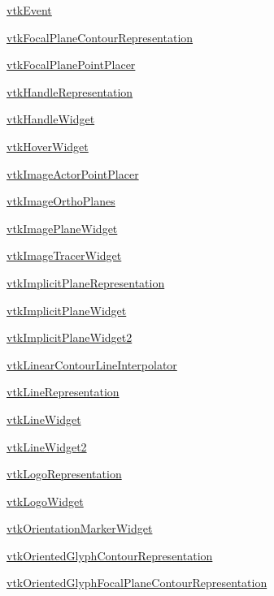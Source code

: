 \begin{DoxyItemize}
\item \hyperlink{vtkwidgets_vtkevent}{vtk\-Event}  
\item \hyperlink{vtkwidgets_vtkfocalplanecontourrepresentation}{vtk\-Focal\-Plane\-Contour\-Representation}  
\item \hyperlink{vtkwidgets_vtkfocalplanepointplacer}{vtk\-Focal\-Plane\-Point\-Placer}  
\item \hyperlink{vtkwidgets_vtkhandlerepresentation}{vtk\-Handle\-Representation}  
\item \hyperlink{vtkwidgets_vtkhandlewidget}{vtk\-Handle\-Widget}  
\item \hyperlink{vtkwidgets_vtkhoverwidget}{vtk\-Hover\-Widget}  
\item \hyperlink{vtkwidgets_vtkimageactorpointplacer}{vtk\-Image\-Actor\-Point\-Placer}  
\item \hyperlink{vtkwidgets_vtkimageorthoplanes}{vtk\-Image\-Ortho\-Planes}  
\item \hyperlink{vtkwidgets_vtkimageplanewidget}{vtk\-Image\-Plane\-Widget}  
\item \hyperlink{vtkwidgets_vtkimagetracerwidget}{vtk\-Image\-Tracer\-Widget}  
\item \hyperlink{vtkwidgets_vtkimplicitplanerepresentation}{vtk\-Implicit\-Plane\-Representation}  
\item \hyperlink{vtkwidgets_vtkimplicitplanewidget}{vtk\-Implicit\-Plane\-Widget}  
\item \hyperlink{vtkwidgets_vtkimplicitplanewidget2}{vtk\-Implicit\-Plane\-Widget2}  
\item \hyperlink{vtkwidgets_vtklinearcontourlineinterpolator}{vtk\-Linear\-Contour\-Line\-Interpolator}  
\item \hyperlink{vtkwidgets_vtklinerepresentation}{vtk\-Line\-Representation}  
\item \hyperlink{vtkwidgets_vtklinewidget}{vtk\-Line\-Widget}  
\item \hyperlink{vtkwidgets_vtklinewidget2}{vtk\-Line\-Widget2}  
\item \hyperlink{vtkwidgets_vtklogorepresentation}{vtk\-Logo\-Representation}  
\item \hyperlink{vtkwidgets_vtklogowidget}{vtk\-Logo\-Widget}  
\item \hyperlink{vtkwidgets_vtkorientationmarkerwidget}{vtk\-Orientation\-Marker\-Widget}  
\item \hyperlink{vtkwidgets_vtkorientedglyphcontourrepresentation}{vtk\-Oriented\-Glyph\-Contour\-Representation}  
\item \hyperlink{vtkwidgets_vtkorientedglyphfocalplanecontourrepresentation}{vtk\-Oriented\-Glyph\-Focal\-Plane\-Contour\-Representation}  

\end{DoxyItemize}
